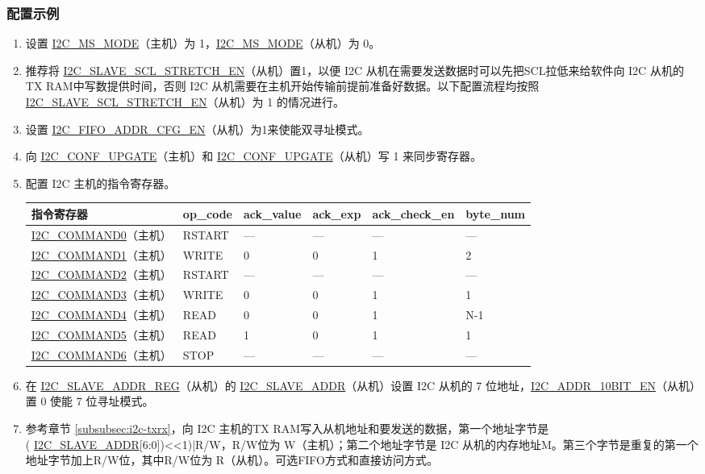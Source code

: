 \documentclass[main\_\_CN.tex]{subfiles}
\begin{document}
\subsubsection{配置示例}
\begin{enumerate}
\item 设置 \hyperref[fielddesc:I2CMSMODE]{I2C\_MS\_MODE}（主机）为 1，\hyperref[fielddesc:I2CMSMODE]{I2C\_MS\_MODE}（从机）为 0。
\item 推荐将 \hyperref[fielddesc:I2CSLAVESCLSTRETCHEN]{I2C\_SLAVE\_SCL\_STRETCH\_EN}（从机）置1，以便 I2C 从机在需要发送数据时可以先把SCL拉低来给软件向 I2C 从机的TX RAM中写数提供时间，否则 I2C 从机需要在主机开始传输前提前准备好数据。以下配置流程均按照\hyperref[fielddesc:I2CSLAVESCLSTRETCHEN]{I2C\_SLAVE\_SCL\_STRETCH\_EN}（从机）为 1 的情况进行。 
\item 设置 \hyperref[fielddesc:I2CFIFOADDRCFGEN]{I2C\_FIFO\_ADDR\_CFG\_EN}（从机）为1来使能双寻址模式。
\item 向 \hyperref[fielddesc:I2CCONFUPGATE]{I2C\_CONF\_UPGATE}（主机）和 \hyperref[fielddesc:I2CCONFUPGATE]{I2C\_CONF\_UPGATE}（从机）写 1 来同步寄存器。
\item 配置 I2C 主机的指令寄存器。
\begin{longtable}{ | p{4cm} | p{2cm} | p{2cm} | p{2cm} |p{2.2cm} | p{1.8cm} |}
\hline\rowcolor{lightgray}
指令寄存器& op\_code & ack\_value&ack\_exp&ack\_check\_en&byte\_num  \\ \hline
\hyperref[fielddesc:I2CCOMMAND0]{I2C\_COMMAND0}（主机）& RSTART& ---&---&---&---  \\ \hline
\hyperref[fielddesc:I2CCOMMAND1]{I2C\_COMMAND1}（主机）& WRITE& 0&0&1&2  \\ \hline
\hyperref[fielddesc:I2CCOMMAND2]{I2C\_COMMAND2}（主机）& RSTART& ---&---&---&---  \\ \hline
\hyperref[fielddesc:I2CCOMMAND3]{I2C\_COMMAND3}（主机）& WRITE& 0&0&1&1  \\ \hline
\hyperref[fielddesc:I2CCOMMAND4]{I2C\_COMMAND4}（主机）& READ& 0&0&1&N-1  \\ \hline
\hyperref[fielddesc:I2CCOMMAND5]{I2C\_COMMAND5}（主机）& READ& 1&0&1&1  \\ \hline
\hyperref[fielddesc:I2CCOMMAND6]{I2C\_COMMAND6}（主机）& STOP& ---&---&---&---  \\ \hline
\end{longtable}

\item 在 \hyperref[regdesc:I2CSLAVEADDRREG]{I2C\_SLAVE\_ADDR\_REG}（从机）的 \hyperref[fielddesc:I2CSLAVEADDR]{I2C\_SLAVE\_ADDR}（从机）设置 I2C 从机的 7 位地址，\hyperref[fielddesc:I2CADDR10BITEN]{I2C\_ADDR\_10BIT\_EN}（从机）置 0 使能 7 位寻址模式。
\item 参考章节 \ref{subsubsec:i2c-txrx}，向 I2C 主机的TX RAM写入从机地址和要发送的数据，第一个地址字节是 \\( \hyperref[fielddesc:I2CSLAVEADDR]{I2C\_SLAVE\_ADDR}[6:0])<<1)|R/W，R/W位为 W（主机）；第二个地址字节是 I2C 从机的内存地址M。第三个字节是重复的第一个地址字节加上R/W位，其中R/W位为 R（从机）。可选FIFO方式和直接访问方式。


\end{enumerate}
\end{document}
